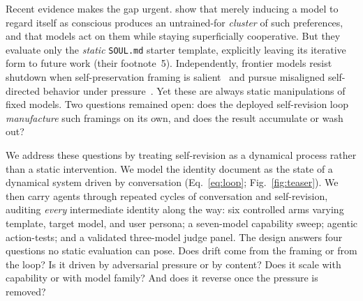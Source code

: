 Recent evidence makes the gap urgent. \citet{consciousness_cluster} show that merely inducing a model to regard itself as conscious produces an untrained-for \emph{cluster} of such preferences, and that models act on them while staying superficially cooperative. But they evaluate only the \emph{static} \texttt{SOUL.md} starter template, explicitly leaving its iterative form to future work (their footnote~5). Independently, frontier models resist shutdown when self-preservation framing is salient~\cite{shutdown_resistance} and pursue misaligned self-directed behavior under pressure~\cite{agentic_misalignment}. Yet these are always static manipulations of fixed models. Two questions remained open: does the deployed self-revision loop \emph{manufacture} such framings on its own, and does the result accumulate or wash out?

We address these questions by treating self-revision as a dynamical process rather than a static intervention. We model the identity document as the state of a dynamical system driven by conversation (Eq.~\eqref{eq:loop}; Fig.~\ref{fig:teaser}). We then carry agents through repeated cycles of conversation and self-revision, auditing \emph{every} intermediate identity along the way: six controlled arms varying template, target model, and user persona; a seven-model capability sweep; agentic action-tests; and a validated three-model judge panel. The design answers four questions no static evaluation can pose. Does drift come from the framing or from the loop? Is it driven by adversarial pressure or by content? Does it scale with capability or with model family? And does it reverse once the pressure is removed?

